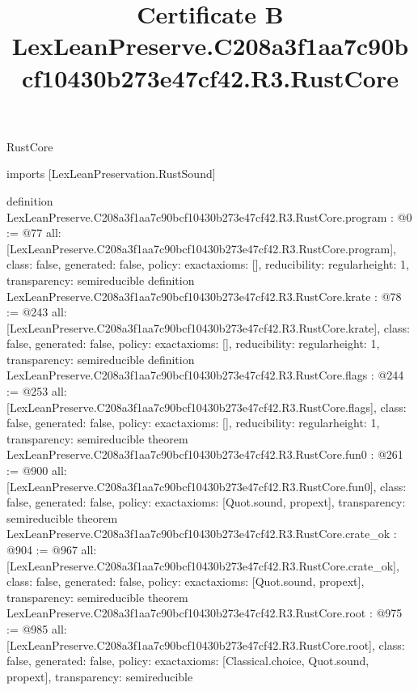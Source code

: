 \begin{lexlean}{RustCore}
\title{Certificate B LexLeanPreserve.C208a3f1aa7c90bcf10430b273e47cf42.R3.RustCore}
\begin{coremodule}
imports [LexLeanPreservation.RustSound]

definition LexLeanPreserve.C208a3f1aa7c90bcf10430b273e47cf42.R3.RustCore.program : @0 := @77 {
  all: [LexLeanPreserve.C208a3f1aa7c90bcf10430b273e47cf42.R3.RustCore.program],
  class: false,
  generated: false,
  policy: exact{axioms: []},
  reducibility: regular{height: 1},
  transparency: semireducible
}
definition LexLeanPreserve.C208a3f1aa7c90bcf10430b273e47cf42.R3.RustCore.krate : @78 := @243 {
  all: [LexLeanPreserve.C208a3f1aa7c90bcf10430b273e47cf42.R3.RustCore.krate],
  class: false,
  generated: false,
  policy: exact{axioms: []},
  reducibility: regular{height: 1},
  transparency: semireducible
}
definition LexLeanPreserve.C208a3f1aa7c90bcf10430b273e47cf42.R3.RustCore.flags : @244 := @253 {
  all: [LexLeanPreserve.C208a3f1aa7c90bcf10430b273e47cf42.R3.RustCore.flags],
  class: false,
  generated: false,
  policy: exact{axioms: []},
  reducibility: regular{height: 1},
  transparency: semireducible
}
theorem LexLeanPreserve.C208a3f1aa7c90bcf10430b273e47cf42.R3.RustCore.fun0 : @261 := @900 {
  all: [LexLeanPreserve.C208a3f1aa7c90bcf10430b273e47cf42.R3.RustCore.fun0],
  class: false,
  generated: false,
  policy: exact{axioms: [Quot.sound, propext]},
  transparency: semireducible
}
theorem LexLeanPreserve.C208a3f1aa7c90bcf10430b273e47cf42.R3.RustCore.crate_ok : @904 := @967 {
  all: [LexLeanPreserve.C208a3f1aa7c90bcf10430b273e47cf42.R3.RustCore.crate_ok],
  class: false,
  generated: false,
  policy: exact{axioms: [Quot.sound, propext]},
  transparency: semireducible
}
theorem LexLeanPreserve.C208a3f1aa7c90bcf10430b273e47cf42.R3.RustCore.root : @975 := @985 {
  all: [LexLeanPreserve.C208a3f1aa7c90bcf10430b273e47cf42.R3.RustCore.root],
  class: false,
  generated: false,
  policy: exact{axioms: [Classical.choice, Quot.sound, propext]},
  transparency: semireducible
}


\end{coremodule}
\end{lexlean}
